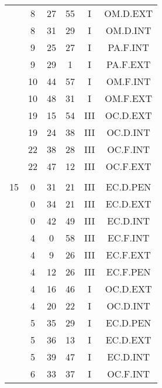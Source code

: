 \documentclass[12pt, a4paper]{article}
\begin{document}
\begin{multicols}{3}
{\begin{tabular}{c c c c c c}
	 	 	 	 & 8 & 27 & 55 & I & OM.D.EXT\\%
	 	 	 	 & 8 & 31 & 29 & I & OM.D.INT\\%
	 	 	 	 & 9 & 25 & 27 & I & PA.F.INT\\%
	 	 	 	 & 9 & 29 & 1 & I & PA.F.EXT\\%
	 	 	 	 & 10 & 44 & 57 & I & OM.F.INT\\%
	 	 	 	 & 10 & 48 & 31 & I & OM.F.EXT\\%
	 	 	 	 & 19 & 15 & 54 & III & OC.D.EXT\\%
	 	 	 	 & 19 & 24 & 38 & III & OC.D.INT\\%
	 	 	 	 & 22 & 38 & 28 & III & OC.F.INT\\%
	 	 	 	 & 22 & 47 & 12 & III & OC.F.EXT\\%
	 	 	 	 & & & & & \\%
	 	 	 	15 & 0 & 31 & 21 & III & EC.D.PEN\\%
	 	 	 	 & 0 & 34 & 21 & III & EC.D.EXT\\%
	 	 	 	 & 0 & 42 & 49 & III & EC.D.INT\\%
	 	 	 	 & 4 & 0 & 58 & III & EC.F.INT\\%
	 	 	 	 & 4 & 9 & 26 & III & EC.F.EXT\\%
	 	 	 	 & 4 & 12 & 26 & III & EC.F.PEN\\%
	 	 	 	 & 4 & 16 & 46 & I & OC.D.EXT\\%
	 	 	 	 & 4 & 20 & 22 & I & OC.D.INT\\%
	 	 	 	 & 5 & 35 & 29 & I & EC.D.PEN\\%
	 	 	 	 & 5 & 36 & 13 & I & EC.D.EXT\\%
	 	 	 	 & 5 & 39 & 47 & I & EC.D.INT\\%
	 	 	 	 & 6 & 33 & 37 & I & OC.F.INT\\%

\end{tabular}}
\end{multicols}
\end{document}
